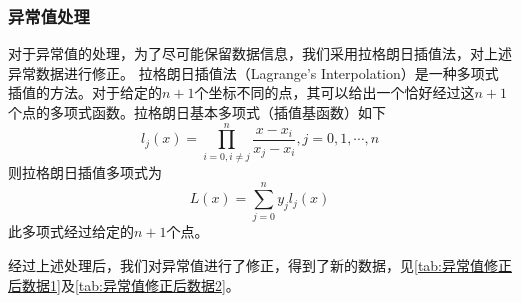 \documentclass{MathModeling}
\begin{document}
	\subsubsection{异常值处理}
对于异常值的处理，为了尽可能保留数据信息，我们采用拉格朗日插值法，对上述异常数据进行修正。
拉格朗日插值法（Lagrange's Interpolation）是一种多项式插值的方法。对于给定的$n+1$个坐标不同的点，其可以给出一个恰好经过这$n+1$个点的多项式函数。拉格朗日基本多项式（插值基函数）如下
\begin{equation}
	l_{j}\left(x\right)=\prod_{i=0,i\neq j}^{n}\frac{x-x_{i}}{x_{j}-x_{i}},j=0,1,\cdots,n
\end{equation}
则拉格朗日插值多项式为
\begin{equation}
	L\left(x\right)=\sum_{j=0}^{n}y_{j}l_{j}\left(x\right)
\end{equation}
此多项式经过给定的$n+1$个点。

经过上述处理后，我们对异常值进行了修正，得到了新的数据，见\textcolor{blue}{\cref{tab:异常值修正后数据1}}及\textcolor{blue}{\cref{tab:异常值修正后数据2}}。
\begin{table}[H]
	\centering
	\caption{人数异常值修正}
	\label{tab:异常值修正后数据1}
\end{table}
\begin{table}[H]
	\centering
	\caption{百分比异常值修正}
	\label{tab:异常值修正后数据2}
\end{table}
\end{document}
